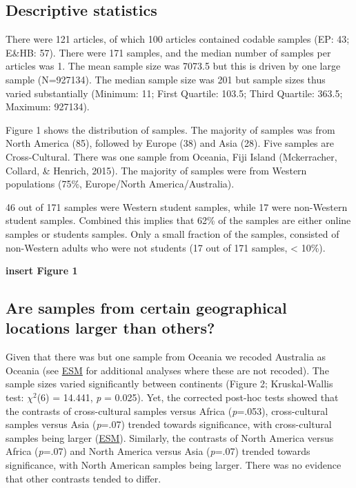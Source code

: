 \documentclass[english,man]{apa6}
\theoremstyle{definition}
\theoremstyle{definition}
\theoremstyle{remark}
\begin{document}
\subsection{Descriptive statistics}\label{descriptive-statistics}

There were 121 articles, of which 100 articles contained codable samples
(EP: 43; E\&HB: 57). There were 171 samples, and the median number of
samples per articles was 1. The mean sample size was 7073.5 but this is
driven by one large sample (N=927134). The median sample size was 201
but sample sizes thus varied substantially (Minimum: 11; First Quartile:
103.5; Third Quartile: 363.5; Maximum: 927134).

Figure 1 shows the distribution of samples. The majority of samples was
from North America (85), followed by Europe (38) and Asia (28). Five
samples are Cross-Cultural. There was one sample from Oceania, Fiji
Island (Mckerracher, Collard, \& Henrich, 2015). The majority of samples
were from Western populations (75\%, Europe/North America/Australia).

46 out of 171 samples were Western student samples, while 17 were
non-Western student samples. Combined this implies that 62\% of the
samples are either online samples or students samples. Only a small
fraction of the samples, consisted of non-Western adults who were not
students (17 out of 171 samples, \textless{} 10\%).

\textbf{insert Figure 1}

\subsection{Are samples from certain geographical locations larger than
others?}\label{are-samples-from-certain-geographical-locations-larger-than-others}

Given that there was but one sample from Oceania we recoded Australia as
Oceania (see \href{http://osf.io/pajhy}{ESM} for additional analyses
where these are not recoded). The sample sizes varied significantly
between continents (Figure 2; Kruskal-Wallis test: \(\chi^2\)(6) =
14.441, \emph{p} = 0.025). Yet, the corrected post-hoc tests showed that
the contrasts of cross-cultural samples versus Africa (\emph{p}=.053),
cross-cultural samples versus Asia (\emph{p}=.07) trended towards
significance, with cross-cultural samples being larger
(\href{http://osf.io/pajhy}{ESM}). Similarly, the contrasts of North
America versus Africa (\emph{p}=.07) and North America versus Asia
(\emph{p}=.07) trended towards significance, with North American samples
being larger. There was no evidence that other contrasts tended to
differ.
\end{document}

